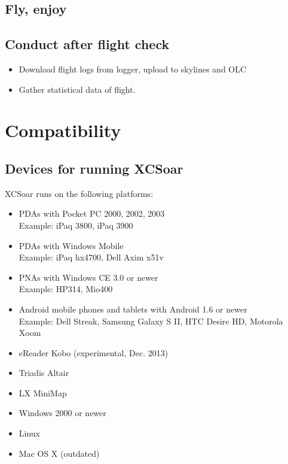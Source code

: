 \subsection*{Fly, enjoy}
\vspace{4em}

\subsection*{Conduct after flight check}
\begin{itemize}
\item Download flight logs from logger, upload to skylines and OLC
\item Gather statistical data of flight.
\end{itemize}
\newpage




\section{Compatibility}

\subsection*{Devices for running XCSoar}

XCSoar runs on the following platforms:

\begin{itemize}
\item PDAs with Pocket PC 2000, 2002, 2003 \\
  Example: iPaq 3800, iPaq 3900
\item PDAs with Windows Mobile \\
  Example: iPaq hx4700, Dell Axim x51v
\item PNAs with Windows CE 3.0 or newer \\
  Example: HP314, Mio400
  \item Android mobile phones and tablets with Android 1.6 or newer \\
  Example: Dell Streak, Samsung Galaxy S II, HTC Desire HD,
  Motorola Xoom
\item eReader Kobo (experimental, Dec. 2013)
\item Triadis Altair
\item LX MiniMap
\item Windows 2000 or newer
\item Linux
\item Mac OS X (outdated)
\end{itemize}

